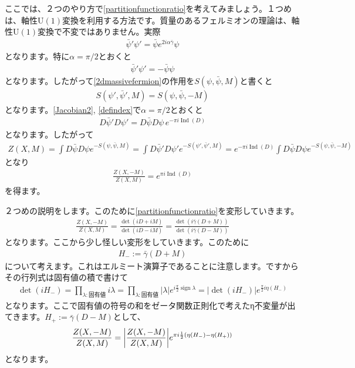 \documentclass[paper=a4, fontsize=12pt, line_length=16cm, number_of_lines=33,dvipdfmx]{jlreq}
\numberwithin{equation}{section}
\newcommand{\psib}{\bar{\psi}}
\newcommand{\gammab}{\bar{\gamma}}
\newcommand{\U}{\mathrm{U}}
\DeclareMathOperator{\sign}{\mathrm{sign}}
\DeclareMathOperator{\Ind}{\mathrm{Ind}}
\newcommand{\Hm}{H_{-}}
\newcommand{\Hp}{H_{+}}
\begin{document}
ここでは、２つのやり方で\eqref{partitionfunctionratio}を考えてみましょう。１つめは、軸性$\U(1)$変換を利用する方法です。質量のあるフェルミオンの理論は、軸性$\U(1)$変換で不変ではありません。実際
\begin{align}
  \psib'\psi'=\psib e^{2i\alpha \gammab}\psi
\end{align}
となります。特に$\alpha=\pi/2$とおくと
\begin{align}
  \psib'\psi'=-\psib \psi
\end{align}
となります。したがって\eqref{2dmassivefermion}の作用を$S(\psi,\psib,M)$と書くと
\begin{align}
  S(\psi',\psib',M)=S(\psi,\psib,-M)
\end{align}
となります。\eqref{Jacobian2}, \eqref{defindex}で$\alpha=\pi/2$とおくと
\begin{align}
  D\psib'D\psi'=D\psib D\psi\, e^{-\pi i \Ind(D)}
\end{align}
となります。したがって
\begin{align}
  Z(X,M)
  =\int D\psib D\psi e^{-S(\psi,\psib,M)}
  =\int D\psib' D\psi' e^{-S(\psi',\psib',M)}
  =e^{-\pi i \Ind(D)}\int D\psib D\psi e^{-S(\psi,\psib,-M)}
\end{align}
となり
\begin{align}
  \frac{Z(X,-M)}{Z(X,M)}=e^{\pi i \Ind(D)}\label{massivephase1}
\end{align}
を得ます。

２つめの説明をします。このために\eqref{partitionfunctionratio}を変形していきます。
\begin{align}
  \frac{Z(X,-M)}{Z(X,M)}=\frac{\det(iD+iM)}{\det(iD-iM)}
  =\frac{\det(i\gammab(D+M))}{\det(i\gammab(D-M))}
\end{align}
となります。ここから少し怪しい変形をしていきます。このために
\begin{align}
  \Hm:=\gammab(D+M)
\end{align}
について考えます。これはエルミート演算子であることに注意します。ですからその行列式は固有値の積で書けて
\begin{align}
  \det(i\Hm)
  =\prod_{\lambda:\text{固有値}}i\lambda
  =\prod_{\lambda:\text{固有値}}|\lambda|e^{i\frac{\pi}{2} \sign \lambda}
  =|\det(i\Hm)|e^{\frac{\pi}{2}i\eta(\Hm)}
\end{align}
となります。ここで固有値の符号の和をゼータ関数正則化で考えたη不変量が出てきます。$\Hp:=\gammab(D-M)$として、
\begin{align}
  \frac{Z(X,-M)}{Z(X,M)}=\qty|\frac{Z(X,-M)}{Z(X,M)}|e^{\pi i \frac12(\eta(\Hm)-\eta(\Hp))}\label{massivephase2}
\end{align}
となります。
\end{document}
